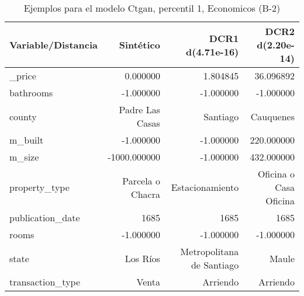 \begin{table}[H]
\centering
\fontsize{10}{14}\selectfont
\caption{Ejemplos para el modelo Ctgan, percentil 1, Economicos (B-2)}
\label{table-example-economicos-b-2-ctgan-1p}
\begin{tabular}{|l|r|r|r|}
\hline
\rowcolor[gray]{0.8}
Variable/Distancia & Sintético & DCR1 d(4.71e-16) & DCR2 d(2.20e-14) \\
\hline \_price & \cellcolor[rgb]{0.9, 0.54, 0.52} 0.000000 & 1.804845 & 36.096892 \\
\hline bathrooms & \cellcolor[rgb]{0.9, 0.54, 0.52} -1.000000 & \cellcolor[rgb]{0.9, 0.54, 0.52} -1.000000 & \cellcolor[rgb]{0.9, 0.54, 0.52} -1.000000 \\
\hline county & \cellcolor[rgb]{0.9, 0.54, 0.52} Padre Las Casas & Santiago & Cauquenes \\
\hline m\_built & \cellcolor[rgb]{0.9, 0.54, 0.52} -1.000000 & \cellcolor[rgb]{0.9, 0.54, 0.52} -1.000000 & 220.000000 \\
\hline m\_size & \cellcolor[rgb]{0.9, 0.54, 0.52} -1000.000000 & \cellcolor[rgb]{0.9, 0.54, 0.52} -1.000000 & 432.000000 \\
\hline property\_type & \cellcolor[rgb]{0.9, 0.54, 0.52} Parcela o Chacra & Estacionamiento & Oficina o Casa Oficina \\
\hline publication\_date & \cellcolor[rgb]{0.9, 0.54, 0.52} 1685 & \cellcolor[rgb]{0.9, 0.54, 0.52} 1685 & \cellcolor[rgb]{0.9, 0.54, 0.52} 1685 \\
\hline rooms & \cellcolor[rgb]{0.9, 0.54, 0.52} -1.000000 & \cellcolor[rgb]{0.9, 0.54, 0.52} -1.000000 & \cellcolor[rgb]{0.9, 0.54, 0.52} -1.000000 \\
\hline state & \cellcolor[rgb]{0.9, 0.54, 0.52} Los Ríos & Metropolitana de Santiago & Maule \\
\hline transaction\_type & \cellcolor[rgb]{0.9, 0.54, 0.52} Venta & Arriendo & Arriendo \\
\hline
\end{tabular}
\end{table}
